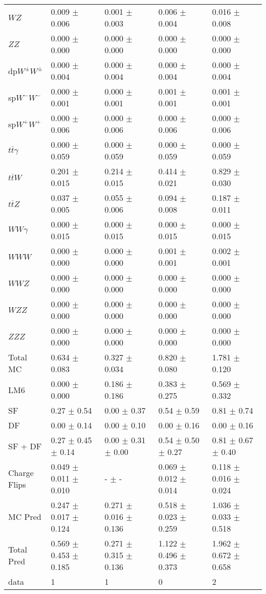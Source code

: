 \begin{tabular}{l | l l l l}
$WZ$ &  0.009 $\pm$  0.006 &  0.001 $\pm$  0.003 &  0.006 $\pm$  0.004 &  0.016 $\pm$  0.008\\
$ZZ$ &  0.000 $\pm$   0.000 &  0.000 $\pm$   0.000 &   0.000 $\pm$   0.000 &   0.000 $\pm$   0.000\\
\hline
dp$W^{\pm}W^{\pm}$ &  0.000 $\pm$  0.004 &  0.000 $\pm$  0.004 &  0.000 $\pm$  0.004 &  0.000 $\pm$  0.004\\
sp$W^{-}W^{-}$ &  0.000 $\pm$  0.001 &  0.000 $\pm$  0.001 &  0.001 $\pm$  0.001 &  0.001 $\pm$  0.001\\
sp$W^{+}W^{+}$ &  0.000 $\pm$  0.006 &  0.000 $\pm$  0.006 &  0.000 $\pm$  0.006 &  0.000 $\pm$  0.006\\
$t\overline{t}\gamma$ &  0.000 $\pm$  0.059 &  0.000 $\pm$  0.059 &  0.000 $\pm$  0.059 &  0.000 $\pm$  0.059\\
$t\overline{t}W$ &  0.201 $\pm$  0.015 &  0.214 $\pm$  0.015 &  0.414 $\pm$  0.021 &  0.829 $\pm$  0.030\\
$t\overline{t}Z$ &  0.037 $\pm$  0.005 &  0.055 $\pm$  0.006 &  0.094 $\pm$  0.008 &  0.187 $\pm$  0.011\\
$WW\gamma$ &  0.000 $\pm$  0.015 &  0.000 $\pm$  0.015 &  0.000 $\pm$  0.015 &  0.000 $\pm$  0.015\\
$WWW$ &   0.000 $\pm$   0.000 &   0.000 $\pm$   0.000 &  0.001 $\pm$  0.001 &  0.002 $\pm$  0.001\\
$WWZ$ &  0.000 $\pm$   0.000 &  0.000 $\pm$   0.000 &  0.000 $\pm$   0.000 &  0.000 $\pm$   0.000\\
$WZZ$ &   0.000 $\pm$   0.000 &  0.000 $\pm$   0.000 &   0.000 $\pm$   0.000 &   0.000 $\pm$   0.000\\
$ZZZ$ &  0.000 $\pm$   0.000 &   0.000 $\pm$   0.000 &   0.000 $\pm$   0.000 &   0.000 $\pm$   0.000\\
\hline
Total MC &  0.634 $\pm$  0.083 &  0.327 $\pm$  0.034 &  0.820 $\pm$  0.080 &  1.781 $\pm$  0.120\\
\hline\hline
\hline
LM6 &  0.000 $\pm$  0.000 &  0.186 $\pm$  0.186 &  0.383 $\pm$  0.275 &  0.569 $\pm$  0.332\\
\hline\hline
\hline\hline
 SF  & 0.27 $\pm$ 0.54 & 0.00 $\pm$ 0.37 & 0.54 $\pm$ 0.59 & 0.81 $\pm$ 0.74\\
 DF  & 0.00 $\pm$ 0.14 & 0.00 $\pm$ 0.10 & 0.00 $\pm$ 0.16 & 0.00 $\pm$ 0.16\\
\hline
 SF + DF  & 0.27 $\pm$ 0.45 $\pm$ 0.14 & 0.00 $\pm$ 0.31 $\pm$ 0.00 & 0.54 $\pm$ 0.50 $\pm$ 0.27 & 0.81 $\pm$ 0.67 $\pm$ 0.40\\
\hline\hline
Charge Flips & 0.049 $\pm$ 0.011 $\pm$ 0.010 & - $\pm$ - & 0.069 $\pm$ 0.012 $\pm$ 0.014 & 0.118 $\pm$ 0.016 $\pm$ 0.024\\
\hline\hline
\hline
MC Pred &  0.247 $\pm$  0.017 $\pm$  0.124 &  0.271 $\pm$  0.016 $\pm$  0.136 &  0.518 $\pm$  0.023 $\pm$  0.259 &  1.036 $\pm$  0.033 $\pm$  0.518\\
\hline\hline
Total Pred &  0.569 $\pm$  0.453 $\pm$  0.185 &  0.271 $\pm$  0.315 $\pm$  0.136 &  1.122 $\pm$  0.496 $\pm$  0.373 &  1.962 $\pm$  0.672 $\pm$  0.658\\
\hline\hline
data & 1 & 1 & 0 & 2\\
\hline\hline
\end{tabular}
